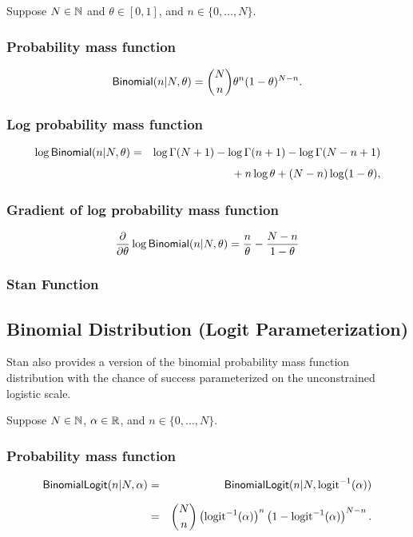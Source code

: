 Suppose $N \in \mathbb{N}$ and $\theta \in [0,1]$, and $n \in
\{0,\ldots,N\}$.  

\subsubsection{Probability mass function}
\[
\mbox{\sf Binomial}(n|N,\theta)
= {N \choose n} \theta^n (1 - \theta)^{N - n}.
\]

\subsubsection{Log probability mass function}
%
\begin{eqnarray*}
\log \mbox{\sf Binomial}(n|N,\theta)
& = &
\log \Gamma(N+1) - \log \Gamma(n + 1) - \log \Gamma(N- n + 1)
\\[4pt]
& & { } + n \log \theta + (N - n) \log (1 - \theta), 
\end{eqnarray*}
%
\subsubsection{Gradient of log probability mass function}
%
\[
\frac{\partial}{\partial \theta} \log \mbox{\sf Binomial}(n|N,\theta)
= \frac{n}{\theta}
- \frac{N - n}{1 - \theta}
\]
\subsubsection{Stan Function}
%
\begin{description}
%
%
\end{description}


\subsection{Binomial Distribution (Logit Parameterization)}

Stan also provides a version of the binomial probability mass function
distribution with the chance of success parameterized on the
unconstrained logistic scale.  

Suppose $N \in \mathbb{N}$, $\alpha \in \mathbb{R}$, and $n \in
\{0,\ldots,N\}$.

\subsubsection{Probability mass function}
\begin{eqnarray*}
\mbox{\sf BinomialLogit}(n|N,\alpha)
& = & \mbox{\sf BinomialLogit}(n|N,\mbox{logit}^{-1}(\alpha))
\\[6pt]
& = & {N \choose n} \left( \mbox{logit}^{-1}(\alpha) \right)^{n}
                    \left( 1 - \mbox{logit}^{-1}(\alpha) \right)^{N - n}.
\end{eqnarray*}
%
